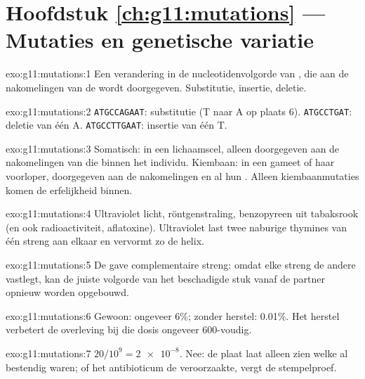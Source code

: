 \section*{Hoofdstuk \ref{ch:g11:mutations} --- Mutaties en genetische variatie}

\begin{solution}{exo:g11:mutations:1}
Een verandering in de nucleotidenvolgorde van , die aan de
nakomelingen van de  wordt doorgegeven. Substitutie, insertie,
deletie.
\end{solution}

\begin{solution}{exo:g11:mutations:2}
\texttt{ATGCCAGAAT}: substitutie (T naar A op plaats 6).
\texttt{ATGCCTGAT}: deletie van één A. \texttt{ATGCCTTGAAT}: insertie van
één T.
\end{solution}

\begin{solution}{exo:g11:mutations:3}
Somatisch: in een lichaamscel, alleen doorgegeven aan de nakomelingen van
die  binnen het individu. Kiembaan: in een gameet of haar voorloper,
doorgegeven aan de nakomelingen en al hun . Alleen
kiembaanmutaties komen de erfelijkheid binnen.
\end{solution}

\begin{solution}{exo:g11:mutations:4}
Ultraviolet licht, röntgenstraling, benzopyreen uit tabaksrook (en ook
radioactiviteit, aflatoxine). Ultraviolet last twee naburige thymines van
één streng aan elkaar en vervormt zo de helix.
\end{solution}

\begin{solution}{exo:g11:mutations:5}
De gave complementaire streng: omdat elke streng de andere vastlegt, kan
de juiste volgorde van het beschadigde stuk vanaf de partner opnieuw
worden opgebouwd.
\end{solution}

\begin{solution}{exo:g11:mutations:6}
Gewoon: ongeveer 6\%; zonder herstel: 0.01\%. Het herstel verbetert de
overleving bij die dosis ongeveer 600-voudig.
\end{solution}

\begin{solution}{exo:g11:mutations:7}
$20/10^9 = \num{2e-8}$. Nee: de plaat laat alleen zien welke  al
bestendig waren; of het antibioticum de  veroorzaakte, vergt de
stempelproef.
\end{solution}

